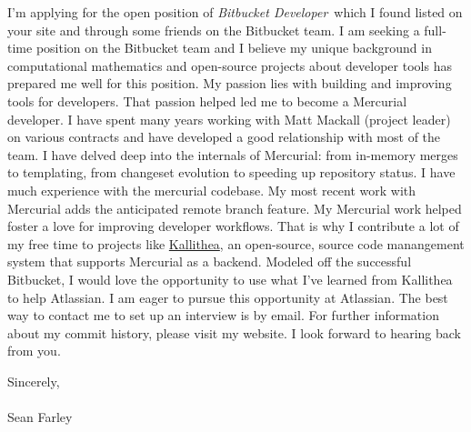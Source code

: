 \documentclass[]{fancy-cv}
\newcommand\company{Atlassian}
\newcommand\position{\emph{Bitbucket Developer}}
\begin{document}
I'm applying for the open position of \position~which I found listed on your
site and through some friends on the Bitbucket team. I am seeking a full-time
position on the Bitbucket team and I believe my unique background in
computational mathematics and open-source projects about developer tools has
prepared me well for this position.
%
\newline\newline
%
My passion lies with building and improving tools for developers. That passion
helped led me to become a Mercurial developer. I have spent many years working
with Matt Mackall (project leader) on various contracts and have developed a
good relationship with most of the team. I have delved deep into the internals
of Mercurial: from in-memory merges to templating, from changeset evolution to
speeding up repository status. I have much experience with the mercurial
codebase. My most recent work with Mercurial adds the anticipated remote
branch feature.
%
\newline\newline
%
My Mercurial work helped foster a love for improving developer workflows. That
is why I contribute a lot of my free time to projects like
\href{https://kallithea-scm.org}{Kallithea}, an open-source, source code
manangement system that supports Mercurial as a backend. Modeled off the
successful Bitbucket, I would love the opportunity to use what I've learned
from Kallithea to help \company.
%
\newline\newline
%
I am eager to pursue this opportunity at \company. The best way to contact me
to set up an interview is by email. For further information about my commit
history, please visit my website. I look forward to hearing back from you.

\vspace{2em}
Sincerely,\\
\\
Sean Farley
\end{document}
